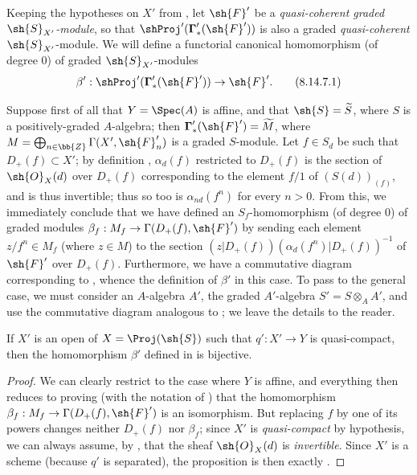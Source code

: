 \begin{env}[8.14.7]
\label{II.8.14.7}
Keeping the hypotheses on $X'$ from , let $\sh{F}'$ be a \emph{quasi-coherent graded $\sh{S}_{X'}$-module}, so that $\shProj'(\boldsymbol{\Gamma}'_*(\sh{F}'))$ is also a graded \emph{quasi-coherent} $\sh{S}_{X'}$-module.
We will define a functorial canonical homomorphism (of degree $0$) of graded $\sh{S}_{X'}$-modules
\[
\label{II.8.14.7.1}
    \beta': \shProj'(\boldsymbol{\Gamma}'_*(\sh{F}')) \to \sh{F}'.
\tag{8.14.7.1}
\]

Suppose first of all that $Y=\Spec(A)$ is affine, and that $\sh{S}=\widetilde{S}$, where $S$ is a positively-graded $A$-algebra;
then $\boldsymbol{\Gamma}'_*(\sh{F}')=\widetilde{M}$, where $M=\bigoplus_{n\in\bb{Z}}\Gamma(X',\sh{F}'_n)$ is a graded $S$-module.
Let $f\in S_d$ be such that $D_+(f)\subset X'$;
by definition , $\alpha_d(f)$ restricted to $D_+(f)$ is the section of $\sh{O}_X(d)$ over $D_+(f)$ corresponding to the element $f/1$ of $(S(d))_{(f)}$, and is thus invertible;
thus so too is $\alpha_{nd}(f^n)$ for every $n>0$.
From this, we immediately conclude that we have defined an $S_f$-homomorphism (of degree $0$) of graded modules $\beta_f:M_f\to\Gamma(D_+(f),\sh{F}')$ by sending each element $z/f^n\in M_f$ (where $z\in M$) to the section $(z|D_+(f))(\alpha_d(f^n)|D_+(f))^{-1}$ of $\sh{F}'$ over $D_+(f)$.
Furthermore, we have a commutative diagram corresponding to , whence the definition of $\beta'$ in this case.
To pass to the general case, we must consider an $A$-algebra $A'$, the graded $A'$-algebra $S'=S\otimes_A A'$, and use the commutative diagram analogous to ;
we leave the details to the reader.
\end{env}

\begin{proposition}[8.14.8]
\label{II.8.14.8}
If $X'$ is an open of $X=\Proj(\sh{S})$ such that $q':X'\to Y$ is quasi-compact, then the homomorphism $\beta'$ defined in  is bijective.
\end{proposition}

\begin{proof}
We can clearly restrict to the case where $Y$ is affine, and everything then reduces to proving (with the notation of ) that the homomorphism $\beta_f:M_f\to\Gamma(D_+(f),\sh{F}')$ is an isomorphism.
But replacing $f$ by one of its powers changes neither $D_+(f)$ nor $\beta_f$;
since $X'$ is \emph{quasi-compact} by hypothesis, we can always assume, by , that the sheaf $\sh{O}_X(d)$ is \emph{invertible}.
Since $X'$ is a scheme (because $q'$ is separated), the proposition is then exactly .
\end{proof}

